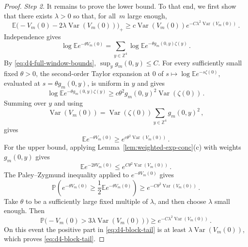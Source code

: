 \documentclass[11pt]{amsart}
\theoremstyle{plain}
\theoremstyle{definition}
\newcommand{\Z}{\mathbb{Z}}
\newcommand{\E}{\mathbb{E}}
\renewcommand{\P}{\mathbb{P}}
\DeclareMathOperator{\Var}{Var}
\begin{document}
\begin{proof}
			\emph{Step 2.}
			It remains to prove the lower bound. To that end, we first show
			that there exists $\lambda>0$ so that, for all~$m$ large enough,
			\begin{equation}\label{eq:d4-block-tail}
				\E\bigl(-V_m(0)-2\lambda \Var(V_m(0))\bigr)_+
				\geq
				c\Var(V_m(0)) e^{-C\lambda^2\Var(V_m(0))} \, . 
			\end{equation}
			Independence gives
			\[
				\log \E e^{-\theta V_m(0)}
				=
				\sum_{y\in\Z^4} \log \E e^{-\theta g_m(0,y)\zeta(y)}\, .
			\]
			By \eqref{eq:d4-full-window-bounds}, $\sup_y g_m(0,y)\leq C$. For
			every sufficiently small fixed $\theta>0$, the second-order Taylor
			expansion at $0$ of
			$s\mapsto\log\E e^{-s\zeta(0)}$, evaluated at
			$s=\theta g_m(0,y)$, is uniform in $y$ and gives
			\[
				\log \E e^{-\theta g_m(0,y)\zeta(y)}
				\geq c\theta^2 g_m(0,y)^2\Var(\zeta(0))\, .
			\]
			Summing over $y$ and using
			\[
				\Var(V_m(0))=\Var(\zeta(0))\sum_{y\in\Z^4} g_m(0,y)^2\, ,
			\]
			gives
			\[
				\E e^{-\theta V_m(0)}
				\geq e^{c\theta^2\Var(V_m(0))}\, .
			\]
			For the upper bound, applying Lemma~\ref{lem:weighted-exp-conc}\textup{(c)} with weights
			$g_m(0,y)$ gives
			\[
				\E e^{-2\theta V_m(0)}
				\leq e^{C\theta^2\Var(V_m(0))}\, .
			\]
			The Paley--Zygmund inequality applied to $e^{-\theta V_m(0)}$ gives
			\[
				\P\left(
				e^{-\theta V_m(0)}
				\geq
				\frac12 \E e^{-\theta V_m(0)}
				\right)
				\geq e^{-C\theta^2\Var(V_m(0))}\, .
			\]
			Take $\theta$ to be a sufficiently large fixed multiple of
			$\lambda$, and then choose $\lambda$ small enough. Then
			\[
				\P\bigl(-V_m(0)>3\lambda \Var(V_m(0))\bigr)
				\geq e^{-C\lambda^2\Var(V_m(0))}\, .
			\]
			On this event the positive part in \eqref{eq:d4-block-tail} is at
			least $\lambda\Var(V_m(0))$, which proves
			\eqref{eq:d4-block-tail}.


\end{proof}
\end{document}
